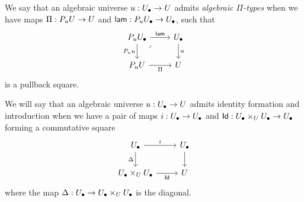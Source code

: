 \begin{definition}
    \label{def:alg-pi-type-mltt}
    We say that an algebraic universe ${u}:{U_\bullet}\to U$
    admits \emph{algebraic $\Pi$-types} when we have maps
    $\Pi : P_{u} U \to U$ and
    $\mathop{\mathsf{lam}} : P_{u} {U_\bullet}\to {U_\bullet}$, such that
    \[ \begin{tikzcd}
      {P_{\uu}{\Ulow}} & \Ulow \\
      {P_{\uu}{\U}} & \U
      \arrow["\lam", from=1-1, to=1-2]
      \arrow["{{P_{\uu}{\uu}}}"', from=1-1, to=2-1]
      \arrow["\lrcorner"{anchor=center, pos=0.125}, draw=none, from=1-1, to=2-2]
      \arrow["\uu", from=1-2, to=2-2]
      \arrow["\Pi"', from=2-1, to=2-2]
    \end{tikzcd} \]
    is a pullback square.
\end{definition}





\begin{definition}\label{def:algebraic-id-form-intro}
  We will say that an algebraic universe ${u} : {U_\bullet} \to U$
  admits identity formation and introduction when
  we have a pair of maps $i : {U_\bullet} \to {U_\bullet}$
  and $\mathsf{Id} : {U_\bullet} \times_U {U_\bullet} \to {U_\bullet}$
  forming a commutative square
  \[ \begin{tikzcd}
    \Ulow & \Ulow \\
    {\Ulow \times_\U \Ulow} & \U
    \arrow["i", from=1-1, to=1-2]
    \arrow["\Delta"', from=1-1, to=2-1]
    \arrow[from=1-2, to=2-2]
    \arrow["\Id"', from=2-1, to=2-2]
  \end{tikzcd} \]
  where the map $\Delta : {U_\bullet} \to {{U_\bullet}\times_U{U_\bullet}}$ is the diagonal. 
\end{definition}

